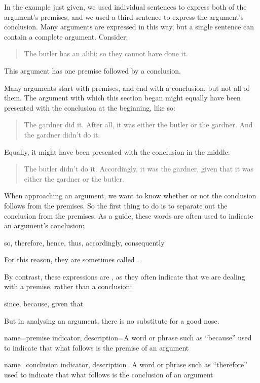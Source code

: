 In the example just given, we used individual sentences to express both of the argument's premises, and we used a third sentence to express the argument's conclusion. Many arguments are expressed in this way, but a single sentence can contain a complete argument. Consider:
	\begin{quote}
		 The butler has an alibi; so they cannot have done it.
	\end{quote}
This argument has one premise followed by a conclusion. 

Many arguments start with premises, and end with a conclusion, but not all of them. The argument with which this section began might equally have been presented with the conclusion at the beginning, like so:
	\begin{quote}
		The gardner did it. After all, it was either the butler or the
		gardner. And the gardner didn't do it. 
	\end{quote}
Equally, it might have been presented with the conclusion in the middle:
	\begin{quote}
		The butler didn't do it. Accordingly, it was the gardner,
		given that it was either the gardner or the butler.
	\end{quote}
When approaching an argument, we want to know whether or not the conclusion follows from the premises. So the first thing to do is to separate out the conclusion from the premises. As a guide, these words are often used to indicate an argument's conclusion:
	\begin{center}
		so, therefore, hence, thus, accordingly, consequently
	\end{center}
For this reason, they are sometimes called .

By contrast, these expressions are ,
as they often indicate that we are dealing with a premise, rather than a
conclusion:
	\begin{center}
		since, because, given that
	\end{center}
But in analysing an argument, there is no substitute for a good nose.

{
name=premise indicator,
description={A word or phrase such as ``because'' used to indicate that what follows is the premise of an argument}
}

{
name=conclusion indicator,
description={A word or phrase such as ``therefore'' used to indicate that what follows is the conclusion of an argument}
}

